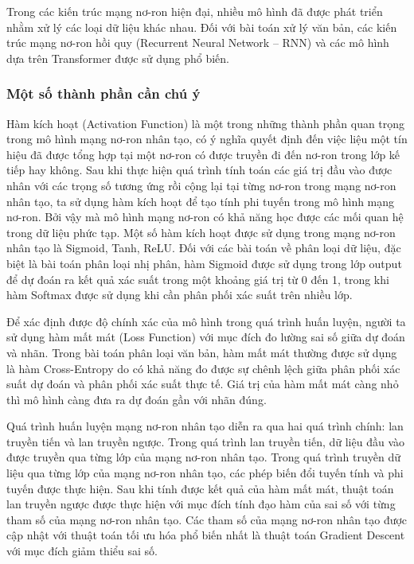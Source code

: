 \documentclass[12pt, a4paper]{report}
\begin{document}
Trong các kiến trúc mạng nơ-ron hiện đại, nhiều mô hình đã được phát triển nhằm xử lý các loại dữ liệu khác nhau. Đối với bài toán xử lý văn bản, các kiến trúc mạng nơ-ron hồi quy (Recurrent Neural Network -- RNN) và các mô hình dựa trên Transformer được sử dụng phổ biến.

\subsubsection{Một số thành phần cần chú ý}

Hàm kích hoạt (Activation Function) là một trong những thành phần quan trọng trong mô hình mạng nơ-ron nhân tạo, có ý nghĩa quyết định đến việc liệu một tín hiệu đã được tổng hợp tại một nơ-ron có được truyền đi đến nơ-ron trong lớp kế tiếp hay không. Sau khi thực hiện quá trình tính toán các giá trị đầu vào được nhân với các trọng số tương ứng rồi cộng lại tại từng nơ-ron trong mạng nơ-ron nhân tạo, ta sử dụng hàm kích hoạt để tạo tính phi tuyến trong mô hình mạng nơ-ron. Bởi vậy mà mô hình mạng nơ-ron có khả năng học được các mối quan hệ trong dữ liệu phức tạp. Một số hàm kích hoạt được sử dụng trong mạng nơ-ron nhân tạo là Sigmoid, Tanh, ReLU. Đối với các bài toán về phân loại dữ liệu, đặc biệt là bài toán phân loại nhị phân, hàm Sigmoid được sử dụng trong lớp output để dự đoán ra kết quả xác suất trong một khoảng giá trị từ 0 đến 1, trong khi hàm Softmax được sử dụng khi cần phân phối xác suất trên nhiều lớp.

Để xác định được độ chính xác của mô hình trong quá trình huấn luyện, người ta sử dụng hàm mất mát (Loss Function) với mục đích đo lường sai số giữa dự đoán và nhãn. Trong bài toán phân loại văn bản, hàm mất mát thường được sử dụng là hàm Cross-Entropy do có khả năng đo được sự chênh lệch giữa phân phối xác suất dự đoán và phân phối xác suất thực tế. Giá trị của hàm mất mát càng nhỏ thì mô hình càng đưa ra dự đoán gần với nhãn đúng.

Quá trình huấn luyện mạng nơ-ron nhân tạo diễn ra qua hai quá trình chính: lan truyền tiến và lan truyền ngược. Trong quá trình lan truyền tiến, dữ liệu đầu vào được truyền qua từng lớp của mạng nơ-ron nhân tạo. Trong quá trình truyền dữ liệu qua từng lớp của mạng nơ-ron nhân tạo, các phép biến đổi tuyến tính và phi tuyến được thực hiện. Sau khi tính được kết quả của hàm mất mát, thuật toán lan truyền ngược được thực hiện với mục đích tính đạo hàm của sai số với từng tham số của mạng nơ-ron nhân tạo. Các tham số của mạng nơ-ron nhân tạo được cập nhật với thuật toán tối ưu hóa phổ biến nhất là thuật toán Gradient Descent với mục đích giảm thiểu sai số.
\end{document}
